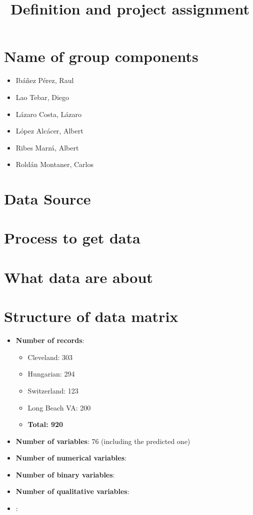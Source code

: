 \documentclass[a4paper,10pt]{article}
\title{Definition and project assignment}
\begin{document}
\maketitle

% 

\section{Name of group components}
\begin{itemize}
\item Ibáñez Pérez, Raul
 \item Lao Tebar, Diego
 \item Lázaro Costa, Lázaro
 \item López Alcácer, Albert
  \item Ribes Marzá, Albert
 \item Roldán Montaner, Carlos
\end{itemize}

\section{Data Source}
\section{Process to get data}
\section{What data are about}
\section{Structure of data matrix}
\begin{itemize}
 \item \textbf{Number of records}: 
 \begin{itemize}
 \item Cleveland: 303
 \item Hungarian: 294
 \item Switzerland: 123
 \item Long Beach VA: 200
 \item \textbf{Total: 920}
 \end{itemize}
 \item \textbf{Number of variables}: 76 (including the predicted one)
 \item \textbf{Number of numerical variables}: 
 \item \textbf{Number of binary variables}: 
 \item \textbf{Number of qualitative variables}:
 \item \textbf{}: 
\end{itemize}
\end{document}
